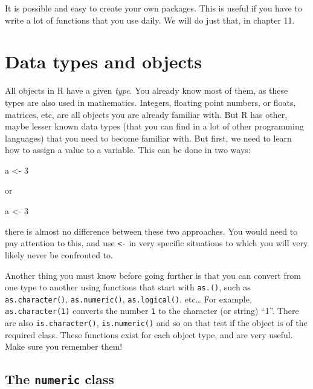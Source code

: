 \documentclass[]{gitbook}
\newenvironment{Shaded}{\begin{snugshade}}{\end{snugshade}}
\newcommand{\DecValTok}[1]{\textcolor[rgb]{0.00,0.00,0.81}{#1}}
\newcommand{\NormalTok}[1]{#1}
\newcommand{\StringTok}[1]{\textcolor[rgb]{0.31,0.60,0.02}{#1}}
\theoremstyle{definition}
\theoremstyle{definition}
\theoremstyle{definition}
\theoremstyle{remark}
\begin{document}
It is possible and easy to create your own packages. This is useful if
you have to write a lot of functions that you use daily. We will do just
that, in chapter 11.

\hypertarget{data-types-and-objects}{%
\section{Data types and objects}\label{data-types-and-objects}}

All objects in R have a given \emph{type}. You already know most of
them, as these types are also used in mathematics. Integers, floating
point numbers, or floats, matrices, etc, are all objects you are already
familiar with. But R has other, maybe lesser known data types (that you
can find in a lot of other programming languages) that you need to
become familiar with. But first, we need to learn how to assign a value
to a variable. This can be done in two ways:

\begin{Shaded}
\begin{Highlighting}[]
\NormalTok{a <-}\StringTok{ }\DecValTok{3}
\end{Highlighting}
\end{Shaded}

or

\begin{Shaded}
\begin{Highlighting}[]
\NormalTok{a <-}\StringTok{ }\DecValTok{3}
\end{Highlighting}
\end{Shaded}

there is almost no difference between these two approaches. You would
need to pay attention to this, and use \texttt{\textless{}-} in very
specific situations to which you will very likely never be confronted
to.

Another thing you must know before going further is that you can convert
from one type to another using functions that start with \texttt{as.()},
such as \texttt{as.character()}, \texttt{as.numeric()},
\texttt{as.logical()}, etc\ldots{} For example, \texttt{as.character(1)}
converts the number \texttt{1} to the character (or string) ``1''. There
are also \texttt{is.character()}, \texttt{is.numeric()} and so on that
test if the object is of the required class. These functions exist for
each object type, and are very useful. Make sure you remember them!

\hypertarget{the-numeric-class}{%
\subsection{\texorpdfstring{The \texttt{numeric}
class}{The numeric class}}\label{the-numeric-class}}
\end{document}
